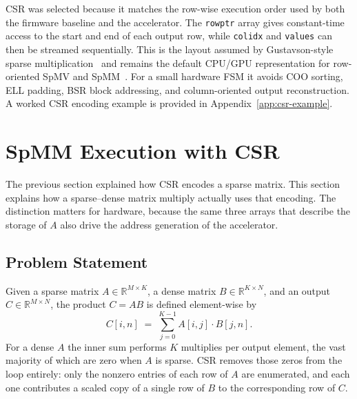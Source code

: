CSR was selected because it matches the row-wise execution order used by both
the firmware baseline and the accelerator. The \texttt{rowptr} array gives
constant-time access to the start and end of each output row, while
\texttt{colidx} and \texttt{values} can then be streamed sequentially. This is
the layout assumed by Gustavson-style sparse multiplication~\citep{gustavson1978}
and remains the default CPU/GPU representation for row-oriented SpMV and
SpMM~\citep{bell_garland2009}. For a small hardware FSM it avoids COO sorting,
ELL padding, BSR block addressing, and column-oriented output reconstruction.
A worked CSR encoding example is provided in Appendix~\ref{app:csr-example}.

\section{SpMM Execution with CSR}
\label{sec:csr-spmm-execution}

The previous section explained how CSR encodes a sparse matrix. This
section explains how a sparse--dense matrix multiply actually uses that
encoding. The distinction matters for hardware, because the same three
arrays that describe the storage of $A$ also drive the address generation
of the accelerator.

\subsection{Problem Statement}

Given a sparse matrix $A \in \mathbb{R}^{M \times K}$, a dense matrix
$B \in \mathbb{R}^{K \times N}$, and an output
$C \in \mathbb{R}^{M \times N}$, the product $C = AB$ is defined
element-wise by
\[
  C[i, n] \;=\; \sum_{j=0}^{K-1} A[i, j] \cdot B[j, n].
\]
For a dense $A$ the inner sum performs $K$ multiplies per output element,
the vast majority of which are zero when $A$ is sparse. CSR removes those
zeros from the loop entirely: only the nonzero entries of each row of $A$
are enumerated, and each one contributes a scaled copy of a single row of
$B$ to the corresponding row of $C$.

